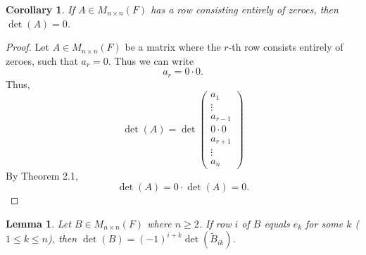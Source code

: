 \documentclass[12pt, a4paper]{article}
\newtheorem{lemma}{Lemma}[section]
\newtheorem{corollary}{Corollary}[theorem]
\theoremstyle{definition}
\theoremstyle{remark}
\begin{document}
    \begin{corollary}
    If $A \in M_{n \times n}(F)$ has a row consisting entirely of zeroes, then $\det(A) = 0$.
    \end{corollary}

    \begin{proof}
    Let $A \in M_{n \times n}(F)$ be a matrix where the $r$-th row consists entirely of zeroes, such that $a_r = 0$. Thus we can write
    \[
    a_r = 0 \cdot 0.
    \]
    Thus,
    \[
    \det(A) = \det \begin{pmatrix}
    a_1 \\
    \vdots \\
    a_{r-1} \\
    0 \cdot 0 \\
    a_{r+1} \\
    \vdots \\
    a_n
    \end{pmatrix}
    \]
    By Theorem 2.1,
    \[
    \det(A) = 0 \cdot \det(A) = 0.
    \]
    \end{proof}

    \begin{lemma}
    Let $B \in M_{n \times n}(F)$ where $n \ge 2$. If row $i$ of $B$ equals $e_k$ for some $k$ ($1 \le k \le n$), then $\det(B) = (-1)^{i+k} \det(\widetilde{B}_{ik})$.
    \end{lemma}
\end{document}
